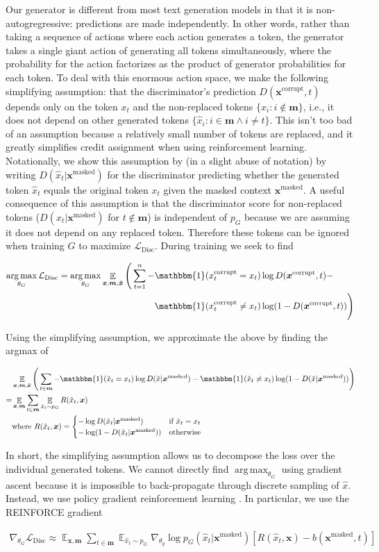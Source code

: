 \documentclass{article}
\newcommand{\alns}[1] {
	\begin{align*} #1 \end{align*}
}
\newcommand{\bmx}{\bm{x}^\text{masked}}
\newcommand{\bfx}{\bm{x}^\text{corrupt}}
\newcommand{\fx}{x^\text{corrupt}}
\newcommand{\bx}{\bm{x}}
\newcommand{\hbx}{\hat{\bm{x}}}
\newcommand{\E} {\mathop{\mathbb{E}}}
\newcommand{\D}{D}
\newcommand{\I}{\bm{m}}
\newcommand{\lossds}{\mathcal{L}_\text{Disc}}
\DeclareMathOperator*{\argmax}{arg\,max}
\begin{document}
Our generator is different from most text generation models in that it is non-autogregressive: predictions are made independently. 
In other words, rather than taking a sequence of actions where each action generates a token, the generator takes a single giant action of generating all tokens simultaneously, where the probability for the action factorizes as the product of generator probabilities for each token. 
To deal with this enormous action space, we make the following simplifying assumption: that the discriminator's prediction $D(\bfx, t)$ depends only on the token $x_t$ and the non-replaced tokens $\{x_i: i \not\in \I \}$, i.e., it does not depend on other generated tokens $\{\hat{x}_i: i \in \I \land i \neq t\}$. This isn't too bad of an assumption because a relatively small number of tokens are replaced, and it greatly simplifies credit assignment when using reinforcement learning. 
Notationally, we show this assumption by (in a slight abuse of notation) by writing $D(\hat{x}_t|\bmx)$ for the discriminator predicting whether the generated token $\hat{x}_t$ equals the original token $x_t$ given the masked context $\bmx$. 
A useful consequence of this assumption is that the discriminator score for non-replaced tokens ($D(x_t|\bmx)$ for $t\not\in \I$) is independent of $p_G$ because we are assuming it does not depend on any replaced token. Therefore these tokens can be ignored when training $G$ to maximize $\lossds$. 
During training we seek to find 
\alns{
\argmax_{\theta_G} \lossds = \argmax_{\theta_G} \E_{\bx, \I, \hbx} \Bigg(\sum_{t=1}^n -&\mathbbm{1}(\fx_t = x_t)\log \D(\bfx, t) - \\ &\mathbbm{1}(\fx_t \neq x_t)\log(1 - \D(\bfx, t)) \Bigg)
}
Using the simplifying assumption, we approximate the above by finding the argmax of 
\alns{
&\E_{\bx, \I, \hbx} \Bigg(\sum_{t \in \I}- \mathbbm{1}(\hat{x}_t = x_t)\log \D(\hat{x}|\bmx) - \mathbbm{1}(\hat{x}_t \neq x_t)\log(1 - \D(\hat{x}|\bmx)) \Bigg) \\
= &\E_{\bx, \I} \sum_{t \in \I} \E_{\hat{x}_t \sim p_G} R(\hat{x}_t, \bx) \\
&\text{where } R(\hat{x}_t, \bx) = \begin{cases}
      -\log \D(\hat{x}_t|\bmx) & \text{if}\ \hat{x}_t = x_t \\
      -\log(1 - \D(\hat{x}_t|\bmx)) & \text{otherwise}
    \end{cases}
}
In short, the simplifying assumption allows us to decompose the loss over the individual generated tokens. 
We cannot directly find $\argmax_{\theta_G}$ using gradient ascent because it is impossible to back-propagate through discrete sampling of $\hat{x}$.
Instead, we use policy gradient reinforcement learning \citep{Williams1992SimpleSG}.
In particular, we use the REINFORCE gradient
\alns{
    \nabla_{\theta_G} \lossds \approx \E_{\bx, \I} \sum_{t \in \I}\E_{\hat{x}_t \sim p_G} \nabla_{\theta_g} \log p_G(\hat{x}_t|\bmx) [R(\hat{x}_t, \bx) - b(\bmx, t)]
}
\end{document}
